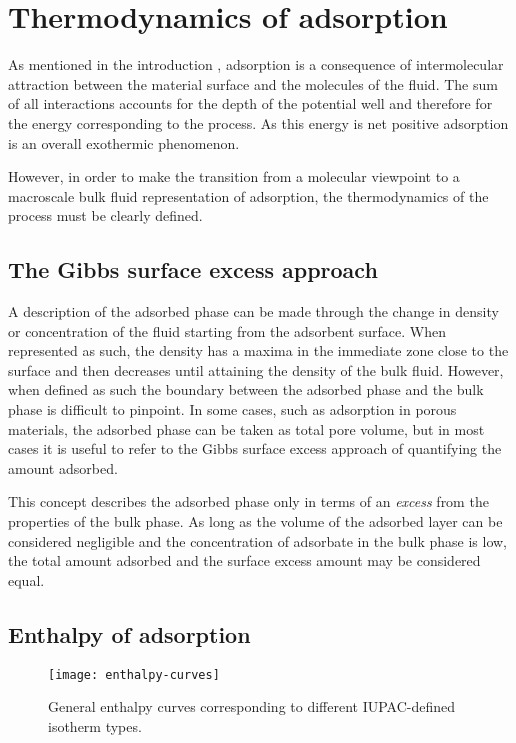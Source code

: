
\section{Thermodynamics of adsorption}

As mentioned in the introduction , adsorption 
is a consequence of intermolecular attraction between the 
material surface and the molecules of the fluid. The sum of 
all interactions accounts for the depth of the potential 
well and therefore for the energy corresponding to the 
process. As this energy is net positive adsorption is an
overall exothermic phenomenon.

However, in order to make the transition from a molecular 
viewpoint to a macroscale bulk fluid representation of 
adsorption, the thermodynamics of the process must be 
clearly defined.

\subsection{The Gibbs surface excess approach}

A description of the adsorbed phase can be made through the change
in density or concentration of the fluid starting from the 
adsorbent surface. When represented as such, the density 
has a maxima in the immediate zone close to the surface and then
decreases until attaining the density of the bulk fluid.
However, when defined as such the boundary between the 
adsorbed phase and the bulk phase is difficult to pinpoint.
In some cases, such as adsorption in porous materials, the 
adsorbed phase can be taken as total pore volume, but in 
most cases it is useful to refer to the Gibbs surface 
excess approach of quantifying the amount adsorbed.

This concept describes the adsorbed phase only in terms
of an \textit{excess} from the properties of the bulk phase. 
As long as the volume of the adsorbed layer can be considered 
negligible and the concentration of adsorbate in the bulk 
phase is low, the total amount adsorbed and the surface excess
amount may be considered equal.

\subsection{Enthalpy of adsorption}

\begin{figure}[htb]
    \centering

    \texttt{[image: enthalpy-curves]}
    \caption{
      General enthalpy curves corresponding to different 
      IUPAC-defined isotherm 
      types\cite{llewellynGasAdsorptionMicrocalorimetry2005}.
    }%
    \label{calo:fig:enthalpy-iupac-iso}

\end{figure}


